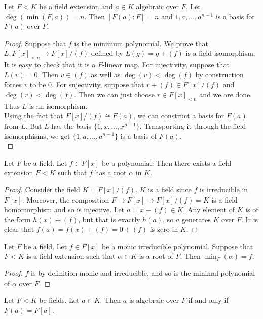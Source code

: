 \documentclass[a4paper]{article}
\begin{document}
\begin{prp}{}{} Let $F<K$ be a field extension and $a\in K$ algebraic over $F$. Let $\deg(\min(F,a))=n$. Then $[F(a):F]=n$ and $1,a,\dots,a^{n-1}$ is a basis for $F(a)$ over $F$. 
\begin{proof}
Suppose that $f$ is the minimum polynomial. We prove that $L:F[x]_{<n}\to F[x]/(f)$ defined by $L(g)=g+(f)$ is a field isomorphism. It is easy to check that it is a $F$-linear map. For injectivity, suppose that $L(v)=0$. Then $v\in(f)$ as well as $\deg(v)<\deg(f)$ by construction forces $v$ to be $0$. For sujectivity, suppose that $r+(f)\in F[x]/(f)$ and $\deg(r)<\deg(f)$. Then we can just choose $r\in F[x]_{<n}$ and we are done. Thus $L$ is an isomorphism. \\
Using the fact that $F[x]/(f)\cong F(a)$, we can construct a basis for $F(a)$ from $L$. But $L$ has the basis $\{1,x,\dots,x^{n-1}\}$. Transporting it through the field isomorphisms, we get $\{1,a,\dots,a^{n-1}\}$ is a basis of $F(a)$. \\
\end{proof}
\end{prp}

\begin{lmm}{}{} Let $F$ be a field. Let $f\in F[x]$ be a polynomial. Then there exists a field extension $F<K$ such that $f$ has a root $\alpha$ in $K$. 
\begin{proof}
Consider the field $K=F[x]/(f)$. $K$ is a field since $f$ is irreducible in $F[x]$. Moreover, the composition $F\to F[x]\to F[x]/(f)=K$ is a field homomorphism and so is injective. Let $a=x+(f)\in K$. Any element of $K$ is of the form $h(x)+(f)$, but that is exactly $h(a)$, so $a$ generates $K$ over $F$. It is clear that $f(a)=f(x)+(f)=0+(f)$ is zero in $K$. 
\end{proof}
\end{lmm}

\begin{crl}{}{} Let $F$ be a field. Let $f\in F[x]$ be a monic irreducible polynomial. Suppose that $F<K$ is a field extension such that $\alpha\in K$ is a root of $F$. Then $\min_F(\alpha)=f$. 
\begin{proof}
$f$ is by definition monic and irreducible, and so is the minimal polynomial of $\alpha$ over $F$. 
\end{proof}
\end{crl}

\begin{prp}{}{} Let $F<K$ be fields. Let $a\in K$. Then $a$ is algebraic over $F$ if and only if $F(a)=F[a]$. 
\end{prp}
\end{document}

